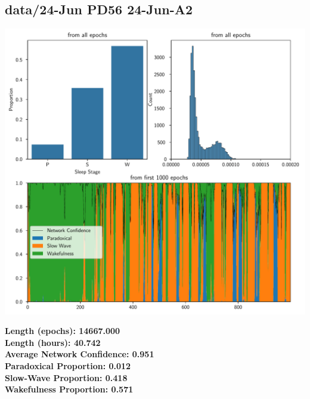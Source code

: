         \subsection*{ data/24-Jun PD56 24-Jun-A2 }
        \begin{center}
        \begin{adjustbox}{width=1\textwidth}
        \includegraphics[page=15]{figs.pdf}
        \end{adjustbox}
        \end{center}
        \large\textbf{Length (epochs): 14667.000}\\
        \textbf{Length (hours): 40.742}\\
        \textbf{Average Network Confidence: 0.951}\\
        \textbf{Paradoxical Proportion: 0.012}\\
        \textbf{Slow-Wave Proportion: 0.418}\\
        \textbf{Wakefulness Proportion: 0.571}\\
        
